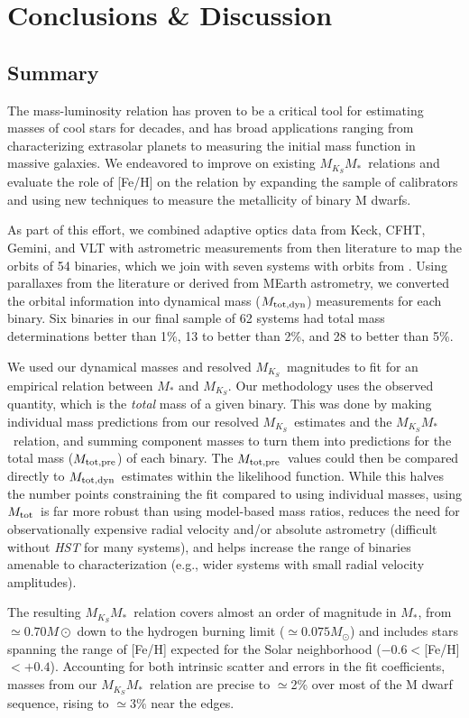 \documentclass[twocolumn]{aastex62}
\newcommand{\mks}{$M_{K_S}$}
\newcommand{\mmk}{$M_{K_S}$\textendash$M_*$}
\newcommand{\mtot}{$M_{\rm{tot}}$}
\newcommand{\mpred}{$M_{\rm{tot,pre}}$}
\newcommand{\mdyn}{$M_{\rm{tot,dyn}}$}
\begin{document}
\section{Conclusions \& Discussion}\label{sec:discussion} 

\subsection{Summary}
The mass-luminosity relation has proven to be a critical tool for estimating masses of cool stars for decades, and has broad applications ranging from characterizing extrasolar planets to measuring the initial mass function in massive galaxies. We endeavored to improve on existing \mmk\ relations and evaluate the role of [Fe/H] on the relation by expanding the sample of calibrators and using new techniques to measure the metallicity of binary M dwarfs. 

As part of this effort, we combined adaptive optics data from Keck, CFHT, Gemini, and VLT with astrometric measurements from then literature to map the orbits of 54 binaries, which we join with seven systems with orbits from \citet{Dupuy2017}. Using parallaxes from the literature or derived from MEarth astrometry, we converted the orbital information into dynamical mass (\mdyn) measurements for each binary. Six binaries in our final sample of 62 systems had total mass determinations better than 1\%, 13 to better than 2\%, and 28 to better than 5\%. 

We used our dynamical masses and resolved \mks\ magnitudes to fit for an empirical relation between $M_*$ and \mks. Our methodology uses the observed quantity, which is the {\it total} mass of a given binary. This was done by making individual mass predictions from our resolved \mks\ estimates and the \mmk\ relation, and summing component masses to turn them into predictions for the total mass (\mpred) of each binary. The \mpred\ values could then be compared directly to \mdyn\ estimates within the likelihood function. While this halves the number points constraining the fit compared to using individual masses, using \mtot\ is far more robust than using model-based mass ratios, reduces the need for observationally expensive radial velocity and/or absolute astrometry (difficult without {\it HST} for many systems), and helps increase the range of binaries amenable to characterization (e.g., wider systems with small radial velocity amplitudes). 

The resulting \mmk\ relation covers almost an order of magnitude in $M_*$, from $\simeq0.70M\odot$ down to the hydrogen burning limit ($\simeq0.075M_\odot$) and includes stars spanning the range of [Fe/H] expected for the Solar neighborhood ($-0.6<$[Fe/H]$<+0.4$). Accounting for both intrinsic scatter and errors in the fit coefficients, masses from our \mmk\ relation are precise to $\simeq$2\% over most of the M dwarf sequence, rising to $\simeq3\%$ near the edges. 
\end{document}
